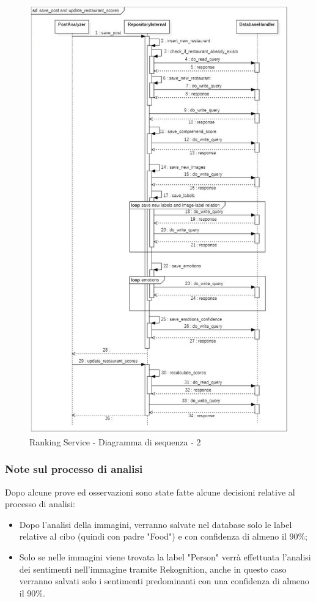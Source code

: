\begin{figure}[H]
    \centering
    \includegraphics[scale=0.55]{Contenuto/Immagini/seq2-RS.JPG}
    \caption{Ranking Service - Diagramma di sequenza - 2}
\end{figure}

\subsubsection{Note sul processo di analisi}
Dopo alcune prove ed osservazioni sono state fatte alcune decisioni relative al processo di analisi:
\begin{itemize}
	\item Dopo l'analisi della immagini, verranno salvate nel database solo le label relative al cibo (quindi con padre "Food") e con confidenza di almeno il 90\%;
	\item Solo se nelle immagini viene trovata la label "Person" verrà effettuata l'analisi dei sentimenti nell'immagine tramite Rekognition, anche in questo caso verranno salvati solo i sentimenti predominanti con una confidenza di almeno il 90\%.
\end{itemize}

